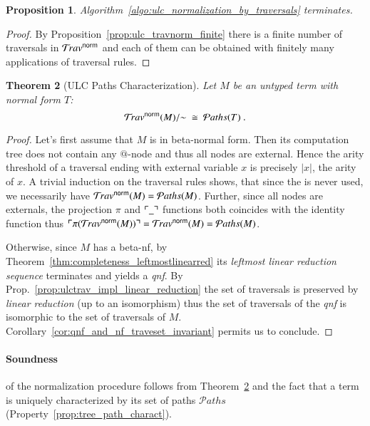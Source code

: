 \documentclass{elsarticle}
\theoremstyle{plain}
\newtheorem{theorem}{Theorem}[section]
\newtheorem{proposition}[theorem]{Proposition}
\theoremstyle{definition}
\theoremstyle{remark}
\newtheorem{remark}{Remark}[section]
\newcommand{\normalizing}{{\sf norm}}
\newcommand{\travsetnorm}{\travset^\normalizing}
\newcommand{\travulc}{\travset}
\def\coresymbol{\pi} %
\newcommand{\core}[1]{\coresymbol(#1)} %
\newcommand\pathset{{\mathcal{P}aths}} %
\begin{document}
\begin{proposition}
Algorithm~\ref{algo:ulc_normalization_by_traversals} terminates.
\end{proposition}
\begin{proof}
By Proposition~\ref{prop:ulc_travnorm_finite} there is a finite number of traversals in $\travsetnorm$ and each of them can be obtained with finitely many applications of traversal rules.
\end{proof}

\begin{theorem}[ULC Paths Characterization]
\label{thm:path_charact_ulc}
Let $M$ be an untyped term with normal form $T$:
$$\travsetnorm(M)/{\sim} \ \cong\ \pathset(T) \ .$$
\end{theorem}
\begin{proof}
Let's first assume that $M$ is in beta-normal form. Then its computation tree does not contain any $@$-node and thus all nodes are external.
Hence the arity threshold of a traversal ending with external variable $x$ is precisely $|x|$, the arity of $x$. A trivial induction on the traversal rules shows, that since the  is never used, we necessarily have  $\travsetnorm(M) = \pathset(M)$. Further, since all nodes are externals, the projection $\coresymbol$ and $\ulcorner \_ \urcorner$ functions both coincides with the identity function thus $\pview{\core{\travsetnorm(M)}} = \travsetnorm(M) = \pathset(M)$.

Otherwise, since $M$ has a beta-nf, by Theorem~\ref{thm:completeness_leftmostlinearred} its \emph{leftmost linear reduction sequence} terminates and yields a \emph{qnf}. By Prop.~\ref{prop:ulctrav_impl_linear_reduction} the set of traversals is preserved by \emph{linear reduction} (up to an isomorphism) thus the set of traversals of the \emph{qnf} is isomorphic to the set of traversals of $M$. Corollary~\ref{cor:qnf_and_nf_traveset_invariant} permits us to conclude.
\end{proof}

\paragraph{Soundness} of the normalization procedure follows from Theorem~\ref{thm:path_charact_ulc} and the fact that a term is uniquely characterized by its set of paths $\pathset$ (Property~\ref{prop:tree_path_charact}).

\end{document}
